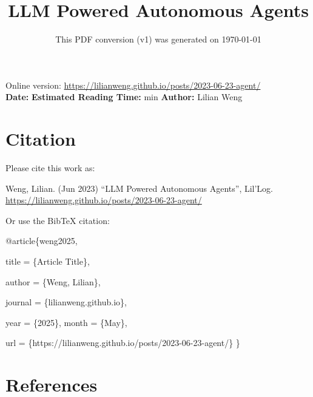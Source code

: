 \documentclass[12pt]{article}
\title{LLM Powered Autonomous Agents}
\date{This PDF conversion (v1) was generated on \today\footnotemark}
\begin{document}
\maketitle
\begin{center}
    Online version: \url{https://lilianweng.github.io/posts/2023-06-23-agent/} \\
    \textbf{Date:} \quad
    \textbf{Estimated Reading Time:}  min \quad
    \textbf{Author:} Lilian Weng
\end{center}




\newpage
\tableofcontents
\newpage
\vspace{1em}
\n\n\n\section{Citation}
Please cite this work as:

\begin{tcolorbox}[colback=black!5!white, colframe=black!80!white, boxrule=0.5pt, arc=2mm, left=1mm, right=1mm, top=1mm, bottom=1mm]
  Weng, Lilian. (Jun 2023) ``LLM Powered Autonomous Agents'', Lil'Log. \url{https://lilianweng.github.io/posts/2023-06-23-agent/}
  \end{tcolorbox}

Or use the BibTeX citation:

\begin{tcolorbox}[
    colback=black!5!white,
    colframe=black!80!white,
    boxrule=0.5pt,
    arc=2mm,
    left=1mm,
    right=1mm,
    top=1mm,
    bottom=1mm,
    listing only,
    listing options={
      basicstyle=\ttfamily\footnotesize,
      breaklines=true,
      literate={\{}{{\char`\{}}1 {\}}{{\char`\}}}1
    }
  ]
  @article\{weng2025,

    title   = \{Article Title\},

    author  = \{Weng, Lilian\},

    journal = \{lilianweng.github.io\},

    year    = \{2025\},
    month   = \{May\},

    url     = \{https://lilianweng.github.io/posts/2023-06-23-agent/\}\n
  \}
  \end{tcolorbox}

\newpage
\section{References}

\n
\end{document}
